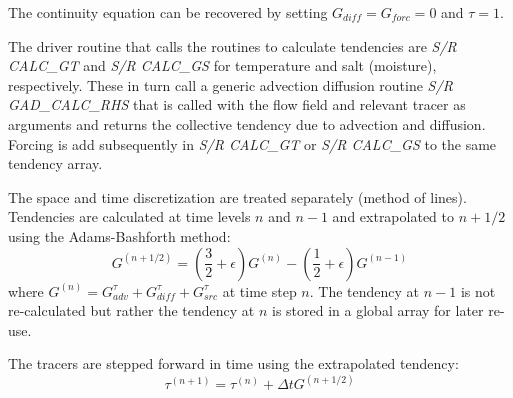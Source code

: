 The continuity equation can be recovered by setting
$G_{diff}=G_{forc}=0$ and $\tau=1$.

The driver routine that calls the routines to calculate tendencies are
{\em S/R CALC\_GT} and {\em S/R CALC\_GS} for temperature and salt
(moisture), respectively. These in turn call a generic advection
diffusion routine {\em S/R GAD\_CALC\_RHS} that is called with the
flow field and relevant tracer as arguments and returns the collective
tendency due to advection and diffusion. Forcing is add subsequently
in {\em S/R CALC\_GT} or {\em S/R CALC\_GS} to the same tendency
array.


The space and time discretization are treated separately (method of
lines). Tendencies are calculated at time levels $n$ and $n-1$ and
extrapolated to $n+1/2$ using the Adams-Bashforth method:
\begin{equation}
G^{(n+1/2)} = 
(\frac{3}{2} + \epsilon) G^{(n)} - (\frac{1}{2} + \epsilon) G^{(n-1)}
\end{equation}
where $G^{(n)} = G_{adv}^\tau + G_{diff}^\tau + G_{src}^\tau$ at time
step $n$. The tendency at $n-1$ is not re-calculated but rather the
tendency at $n$ is stored in a global array for later re-use.


The tracers are stepped forward in time using the extrapolated tendency:
\begin{equation}
\tau^{(n+1)} = \tau^{(n)} + \Delta t G^{(n+1/2)}
\end{equation}

